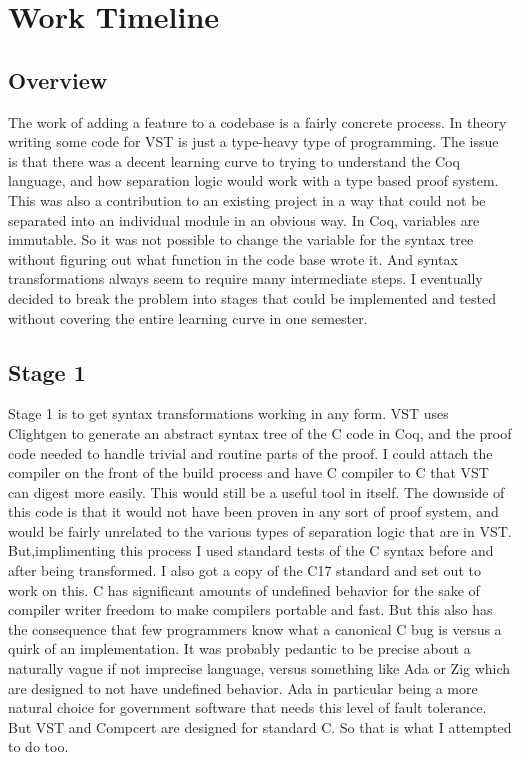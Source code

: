 \section{Work Timeline}
\label{sec:concrete strategy}

\subsection{Overview}

The work of adding a feature to a codebase is a fairly concrete process. In theory writing some code for VST is just a type-heavy type of programming. The issue is that there was a decent learning curve to trying to understand the Coq language, and how separation logic would work with a type based proof system. This was also a contribution to an existing project in a way that could not be separated into an individual module in an obvious way. In Coq, variables are immutable. So it was not possible to change the variable for the syntax tree without figuring out what function in the code base wrote it. And syntax transformations always seem to require many intermediate steps. I eventually decided to break the problem into stages that could be implemented and tested without covering the entire learning curve in one semester.

\subsection{Stage 1}

Stage 1 is to get syntax transformations working in any form. VST uses Clightgen to generate an abstract syntax tree of the C code in Coq, and the proof code needed to handle trivial and routine parts of the proof. I could attach the compiler on the front of the build process and have C compiler to C that VST can digest more easily. This would still be a useful tool in itself. The downside of this code is that it would not have been proven in any sort of proof system, and would be fairly unrelated to the various types of separation logic that are in VST. But,implimenting this process I used standard tests of the C syntax before and after being transformed. I also got a copy of the C17 standard and set out to work on this. C has significant amounts of undefined behavior for the sake of compiler writer freedom to make compilers portable and fast. But this also has the consequence that few programmers know what a canonical C bug is versus a quirk of an implementation. It was probably pedantic to be precise about a naturally vague if not imprecise language, versus something like Ada or Zig which are designed to not have undefined behavior. Ada in particular being a more natural choice for government software that needs this level of fault tolerance. But VST and Compcert are designed for standard C. So that is what I attempted to do too.

